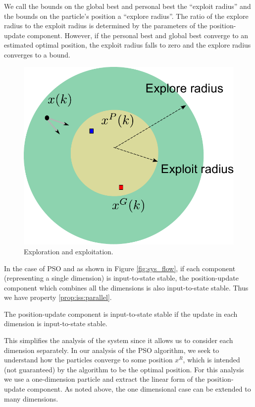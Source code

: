 We call the bounds on the global best and personal best the ``exploit radius'' and the bounds on the particle's position a ``explore radius''.
The ratio of the explore radius to the exploit radius is determined by the parameters of the position-update component.
However, if the personal best and global best converge to an estimated optimal position, the exploit radius falls to zero and the explore radius converges to a bound.

\begin{figure}
\centering
\includegraphics[width=0.5\linewidth]{./fig/explore_and_exploit.pdf}
\caption{Exploration and exploitation.}
\label{fig:explore_and_exploit}
\end{figure}

In the case of PSO and as shown in Figure \ref{fig:sys_flow}, if each component (representing a single dimension) is input-to-state stable, the position-update component which combines all the dimensions is also input-to-state stable.
Thus we have property \ref{prop:iss:parallel}.
\begin{myprop}
\label{prop:iss:parallel}
The position-update component is input-to-state stable if the update in each dimension is input-to-state stable.
\end{myprop}
This simplifies the analysis of the system since it allows us to consider each dimension separately.
In our analysis of the PSO algorithm, we seek to understand how the particles converge to some position $ x^{R} $, which is intended (not guaranteed) by the algorithm to be the optimal position.
For this analysis we use a one-dimension particle and extract the linear form of the position-update component.
As noted above, the one dimensional case can be extended to many dimensions.


